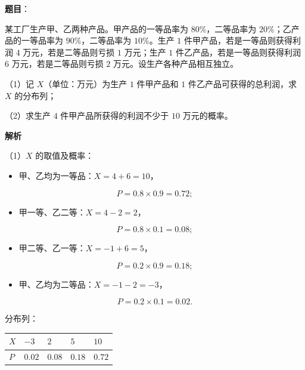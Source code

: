 \begin{answer}

\textbf{题目}：

某工厂生产甲、乙两种产品。甲产品的一等品率为 $80\%$，二等品率为 $20\%$；乙产品的一等品率为 $90\%$，二等品率为 $10\%$。生产 $1$ 件甲产品，若是一等品则获得利润 $4$ 万元，若是二等品则亏损 $1$ 万元；生产 $1$ 件乙产品，若是一等品则获得利润 $6$ 万元，若是二等品则亏损 $2$ 万元。设生产各种产品相互独立。

（1）记 $X$（单位：万元）为生产 $1$ 件甲产品和 $1$ 件乙产品可获得的总利润，求 $X$ 的分布列；

（2）求生产 $4$ 件甲产品所获得的利润不少于 $10$ 万元的概率。

\textbf{解析}

（1）$X$ 的取值及概率：

\begin{itemize}
\item 甲、乙均为一等品：$X=4+6=10$，
\end{itemize}

\nopagebreak[4]
\[P=0.8\times0.9=0.72;\]

\begin{itemize}
\item 甲一等、乙二等：$X=4-2=2$，
\end{itemize}

\nopagebreak[4]
\[P=0.8\times0.1=0.08;\]

\begin{itemize}
\item 甲二等、乙一等：$X=-1+6=5$，
\end{itemize}

\nopagebreak[4]
\[P=0.2\times0.9=0.18;\]

\begin{itemize}
\item 甲、乙均为二等品：$X=-1-2=-3$，
\end{itemize}

\nopagebreak[4]
\[P=0.2\times0.1=0.02.\]

分布列：

\begin{center}
\begin{tabular}{lllll}
\toprule
$X$ & $-3$ & $2$ & $5$ & $10$ \\
\midrule
$P$ & $0.02$ & $0.08$ & $0.18$ & $0.72$ \\
\bottomrule
\end{tabular}
\end{center}


\end{answer}
